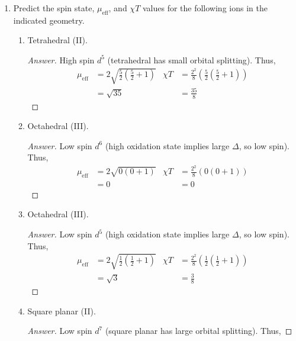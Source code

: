 \documentclass[../psets.tex]{subfiles}
\begin{document}
\begin{enumerate}
\begin{enumerate}[label={\alph*)}]
\begin{proof}[Answer]
        \end{proof}
    \end{enumerate}
    \item Predict the spin state, $\mu_\text{eff}$, and $\chi T$ values for the following ions in the indicated geometry.
    \begin{enumerate}[label={\alph*)}]
        \item Tetrahedral (II).
        \begin{proof}[Answer]
            High spin $d^5$ (tetrahedral has small orbital splitting). Thus,
            \begin{align*}
                \mu_\text{eff} &= 2\sqrt{\frac{5}{2}\left( \frac{5}{2}+1 \right)}&
                    \chi T &= \frac{2^2}{8}\left( \frac{5}{2}\left( \frac{5}{2}+1 \right) \right)\\
                &= \sqrt{35}&
                    &= \frac{35}{8}
            \end{align*}
        \end{proof}
        \item Octahedral (III).
        \begin{proof}[Answer]
            Low spin $d^6$ (high oxidation state implies large $\Delta$, so low spin). Thus,
            \begin{align*}
                \mu_\text{eff} &= 2\sqrt{0(0+1)}&
                    \chi T &= \frac{2^2}{8}(0(0+1))\\
                &= 0&
                    &= 0
            \end{align*}
        \end{proof}
        \item Octahedral (III).
        \begin{proof}[Answer]
            Low spin $d^5$ (high oxidation state implies large $\Delta$, so low spin). Thus,
            \begin{align*}
                \mu_\text{eff} &= 2\sqrt{\frac{1}{2}\left( \frac{1}{2}+1 \right)}&
                    \chi T &= \frac{2^2}{8}\left( \frac{1}{2}\left( \frac{1}{2}+1 \right) \right)\\
                &= \sqrt{3}&
                    &= \frac{3}{8}
            \end{align*}
        \end{proof}
        \item Square planar (II).
        \begin{proof}[Answer]
            Low spin $d^7$ (square planar has large orbital splitting). Thus,

\end{proof}
\end{enumerate}
\end{enumerate}
\end{document}
